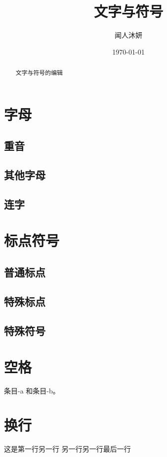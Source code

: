 \documentclass[UTF8]{ctexart}
\title{文字与符号}
\author{闻人沐妍}
\date{\today}
\begin{document}
    \maketitle

        \begin{abstract}
        文字与符号的编辑
    \end{abstract}

    \tableofcontents

    \section{字母}
        \subsection{重音}

        \subsection{其他字母}
        
        \subsection{连字}

    \section{标点符号}
        \subsection{普通标点}

        \subsection{特殊标点}

        \subsection{特殊符号}

    \section{空格}
        \mbox{条目}-a 和条目-b。

    \section{换行}
        这是第一行\linebreak[4]
        另一行\linebreak
        另一行\linebreak[2]
        另一行\linebreak[0]
        最后一行
\end{document}
